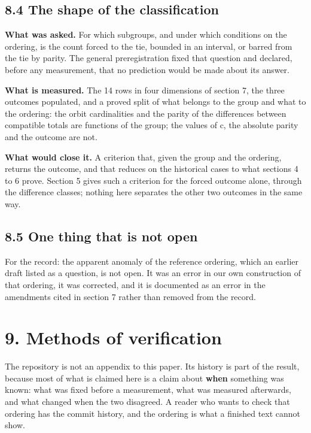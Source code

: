 \documentclass[11pt,a4paper]{article}
\begin{document}
\subsection*{8.4 The shape of the classification}

\textbf{What was asked.} For which subgroups, and under which conditions on the ordering, is the count forced to the tie, bounded in an interval, or barred from the tie by parity. The general preregistration fixed that question and declared, before any measurement, that no prediction would be made about its answer.

\textbf{What is measured.} The 14 rows in four dimensions of section 7, the three outcomes populated, and a proved split of what belongs to the group and what to the ordering: the orbit cardinalities and the parity of the differences between compatible totals are functions of the group; the values of c, the absolute parity and the outcome are not.

\textbf{What would close it.} A criterion that, given the group and the ordering, returns the outcome, and that reduces on the historical cases to what sections 4 to 6 prove. Section 5 gives such a criterion for the forced outcome alone, through the difference classes; nothing here separates the other two outcomes in the same way.

\subsection*{8.5 One thing that is not open}

For the record: the apparent anomaly of the reference ordering, which an earlier draft listed as a question, is not open. It was an error in our own construction of that ordering, it was corrected, and it is documented as an error in the amendments cited in section 7 rather than removed from the record.

\section*{9. Methods of verification}

The repository is not an appendix to this paper. Its history is part of the result, because most of what is claimed here is a claim about \textbf{when} something was known: what was fixed before a measurement, what was measured afterwards, and what changed when the two disagreed. A reader who wants to check that ordering has the commit history, and the ordering is what a finished text cannot show.
\end{document}
